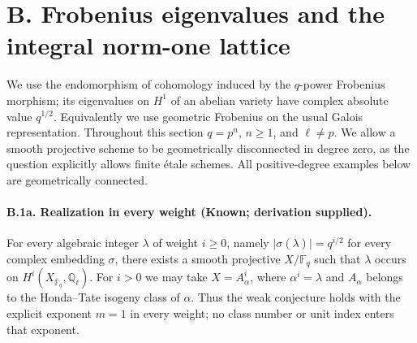 \section{B. Frobenius eigenvalues and the integral norm-one lattice}

We use the endomorphism of cohomology induced by the $q$-power
Frobenius morphism; its eigenvalues on $H^1$ of an abelian variety have
complex absolute value $q^{1/2}$. Equivalently we use geometric Frobenius
on the usual Galois representation. Throughout this section $q=p^n$,
$n\geq1$, and $\ell\ne p$. We allow a smooth projective scheme to be
geometrically disconnected in degree zero, as the question explicitly
allows finite \'etale schemes. All positive-degree examples below are
geometrically connected.

\paragraph{B.1a. Realization in every weight (Known; derivation supplied).}
\label{B1a}
For every algebraic integer $\lambda$ of weight $i\geq0$, namely
$|\sigma(\lambda)|=q^{i/2}$ for every complex embedding $\sigma$, there
exists a smooth projective $X/\mathbb F_q$ such that $\lambda$ occurs on
$H^i(X_{\overline{\mathbb F}_q},\mathbb Q_\ell)$. For $i>0$ we may take
$X=A_\alpha^i$, where $\alpha^i=\lambda$ and $A_\alpha$ belongs to the
Honda--Tate isogeny class of $\alpha$. Thus the weak conjecture holds with
the explicit exponent $m=1$ in every weight; no class number or unit
index enters that exponent.

